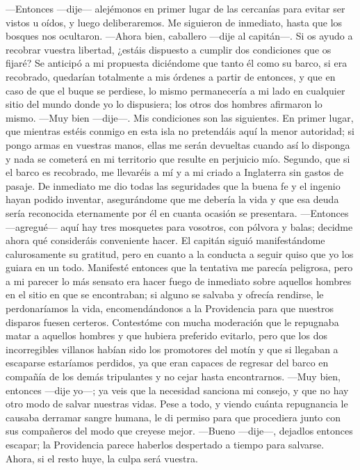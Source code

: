 \documentclass{novela}
\begin{document}
    —Entonces —dije— alejémonos en primer lugar de las cercanías para evitar ser vistos u oídos, y luego deliberaremos.
    Me siguieron de inmediato, hasta que los bosques nos ocultaron.
    —Ahora bien, caballero —dije al capitán—. Si os ayudo a recobrar vuestra libertad, ¿estáis dispuesto a cumplir dos condiciones que os fijaré?
    Se anticipó a mi propuesta diciéndome que tanto él como su barco, si era recobrado, quedarían totalmente a mis órdenes a partir de entonces, y que en caso de que el buque se perdiese, lo mismo permanecería a mi lado en cualquier sitio del mundo donde yo lo dispusiera; los otros dos hombres afirmaron lo mismo.
    —Muy bien —dije—. Mis condiciones son las siguientes. En primer lugar, que mientras estéis conmigo en esta isla no pretendáis aquí la menor autoridad; si pongo armas en vuestras manos, ellas me serán devueltas cuando así lo disponga y nada se cometerá en mi territorio que resulte en perjuicio mío. Segundo, que si el barco es recobrado, me llevaréis a mí y a mi criado a Inglaterra sin gastos de pasaje.
    De inmediato me dio todas las seguridades que la buena fe y el ingenio hayan podido inventar, asegurándome que me debería la vida y que esa deuda sería reconocida eternamente por él en cuanta ocasión se presentara.
    —Entonces —agregué— aquí hay tres mosquetes para vosotros, con pólvora y balas; decidme ahora qué consideráis conveniente hacer.
    El capitán siguió manifestándome calurosamente su gratitud, pero en cuanto a la conducta a seguir quiso que yo los guiara en un todo.
    Manifesté entonces que la tentativa me parecía peligrosa, pero a mi parecer lo más sensato era hacer fuego de inmediato sobre aquellos hombres en el sitio en que se encontraban; si alguno se salvaba y ofrecía rendirse, le perdonaríamos la vida, encomendándonos a la Providencia para que nuestros disparos fuesen certeros.
    Contestóme con mucha moderación que le repugnaba matar a aquellos hombres y que hubiera preferido evitarlo, pero que los dos incorregibles villanos habían sido los promotores del motín y que si llegaban a escaparse estaríamos perdidos, ya que eran capaces de regresar del barco en compañía de los demás tripulantes y no cejar hasta encontrarnos.
    —Muy bien, entonces —dije yo—; ya veis que la necesidad sanciona mi consejo, y que no hay otro modo de salvar nuestras vidas.
    Pese a todo, y viendo cuánta repugnancia le causaba derramar sangre humana, le di permiso para que procediera junto con sus compañeros del modo que creyese mejor.
    —Bueno —dije—, dejadlos entonces escapar; la Providencia parece haberlos despertado a tiempo para salvarse. Ahora, si el resto huye, la culpa será vuestra.
\end{document}
